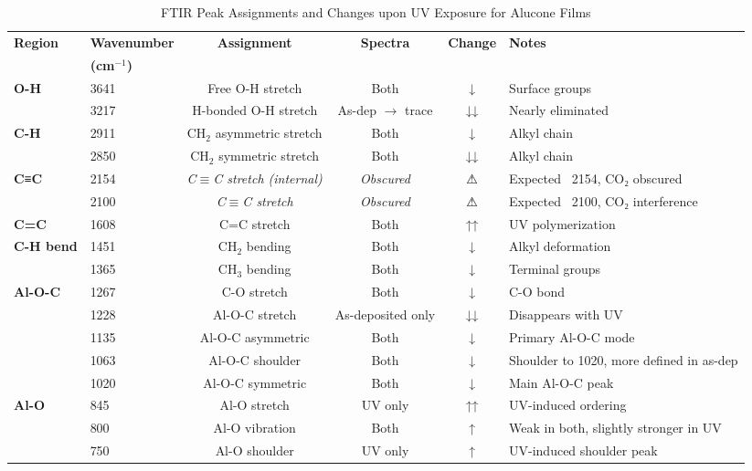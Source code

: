 \begin{table*}[ht]
\centering
\caption{FTIR Peak Assignments and Changes upon UV Exposure for Alucone Films}
\label{tab:ftir_peaks}
\begin{tabular}{llcccl}
\hline
\textbf{Region} & \textbf{Wavenumber} & \textbf{Assignment} & \textbf{Spectra} & \textbf{Change} & \textbf{Notes} \\
 & \textbf{(cm$^{-1}$)} &  &  &  &  \\
\hline
\multirow{2}{*}{\textbf{O-H}} & 3641 & Free O-H stretch & Both & ↓ & Surface groups \\
 & 3217 & H-bonded O-H stretch & As-dep $\rightarrow$ trace & ↓↓ & Nearly eliminated \\
\hline
\multirow{2}{*}{\textbf{C-H}} & 2911 & CH$_2$ asymmetric stretch & Both & ↓ & Alkyl chain \\
 & 2850 & CH$_2$ symmetric stretch & Both & ↓↓ & Alkyl chain \\
\hline
\multirow{2}{*}{\textbf{C≡C}} & 2154 & \textit{C$\equiv$C stretch (internal)} & \textit{Obscured} & ⚠ & Expected ~2154, CO₂ obscured \\
 & 2100 & \textit{C$\equiv$C stretch} & \textit{Obscured} & ⚠ & Expected ~2100, CO₂ interference \\
\hline
\multirow{1}{*}{\textbf{C=C}} & 1608 & C=C stretch & Both & ↑↑ & UV polymerization \\
\hline
\multirow{2}{*}{\textbf{C-H bend}} & 1451 & CH$_2$ bending & Both & ↓ & Alkyl deformation \\
 & 1365 & CH$_3$ bending & Both & ↓ & Terminal groups \\
\hline
\multirow{5}{*}{\textbf{Al-O-C}} & 1267 & C-O stretch & Both & ↓ & C-O bond \\
 & 1228 & Al-O-C stretch & As-deposited only & ↓↓ & Disappears with UV \\
 & 1135 & Al-O-C asymmetric & Both & ↓ & Primary Al-O-C mode \\
 & 1063 & Al-O-C shoulder & Both & ↓ & Shoulder to 1020, more defined in as-dep \\
 & 1020 & Al-O-C symmetric & Both & ↓ & Main Al-O-C peak \\
\hline
\multirow{6}{*}{\textbf{Al-O}} & 845 & Al-O stretch & UV only & ↑↑ & UV-induced ordering \\
 & 800 & Al-O vibration & Both & ↑ & Weak in both, slightly stronger in UV \\
 & 750 & Al-O shoulder & UV only & ↑ & UV-induced shoulder peak \\

\end{tabular}
\end{table*}
